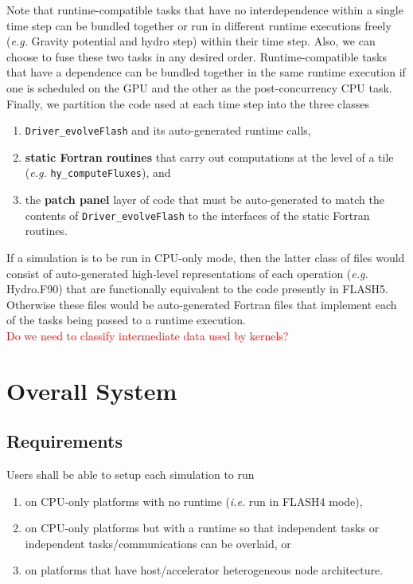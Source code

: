 \documentclass{article}
\begin{document}
Note that runtime-compatible tasks that have no interdependence within a single
time step can be bundled together or run in different runtime executions freely
(\textit{e.g.} Gravity potential and hydro step) within their time step.  Also,
we can choose to fuse these two tasks in any desired order.  Runtime-compatible
tasks that have a dependence can be bundled together in the same runtime
execution if one is scheduled on the GPU and the other as the 
post-concurrency CPU task.\\

Finally, we partition the code used at each time step into the three classes
\begin{enumerate}
\item{\texttt{Driver\_evolveFlash} and its auto-generated runtime calls,}
\item{\textbf{static Fortran routines} that carry out computations at the
level of a tile (\textit{e.g.} \texttt{hy\_computeFluxes}), and}
\item{the \textbf{patch panel} layer of code that must be auto-generated to
match the contents of \texttt{Driver\_evolveFlash} to the interfaces of the
static Fortran routines.}
\end{enumerate}
If a simulation is to be run in CPU-only mode, then the latter class of files
would consist of auto-generated high-level representations of each operation
(\textit{e.g.} Hydro.F90) that are functionally equivalent to the code presently
in FLASH5.  Otherwise these files would be auto-generated Fortran files that
implement each of the tasks being passed to a runtime execution.\\

\textcolor{red}{Do we need to classify intermediate data used by kernels?}

\section{Overall System}
\subsection{Requirements}
Users shall be able to setup each simulation to run
\begin{enumerate}
\item{on CPU-only platforms with no runtime (\textit{i.e.} run in FLASH4 mode),}
\item{on CPU-only platforms but with a runtime so that independent tasks or
independent tasks/communications can be overlaid, or}
\item{on platforms that have host/accelerator heterogeneous node architecture.}
\end{enumerate}
\end{document}
